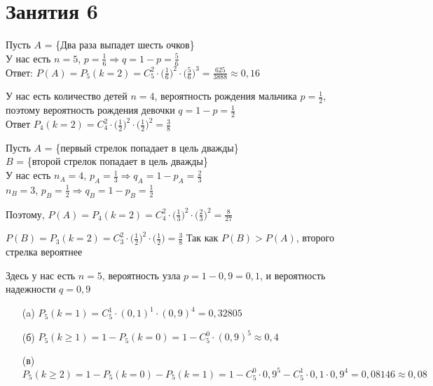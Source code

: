 \section*{Занятия 6}

\begin{exercise}[1]
	Пусть $A$ = \{Два раза выпадет шесть очков\} \\ У нас есть $n = 5$, $p = \frac{1}{6} \Rightarrow q = 1-p = \frac{5}{6}$ \\ Ответ: $P(A) = P_5(k=2) = C^2_5 \cdot \Big(\frac{1}{6}\Big)^2 \cdot \Big(\frac{5}{6}\Big)^3 = \frac{625}{3888} \approx 0,16$
\end{exercise}

\begin{exercise}[2]
	У нас есть количество детей $n=4$, вероятность рождения мальчика $p=\frac{1}{2}$, поэтому вероятность рождения девочки $q = 1-p = \frac{1}{2}$ \\ Ответ $P_4(k=2) = C^2_4 \cdot \Big(\frac{1}{2}\Big)^2 \cdot \Big(\frac{1}{2}\Big)^2 = \frac{3}{8}$
\end{exercise}

\begin{exercise}[3]
	Пусть $A$ = \{первый стрелок попадает в цель дважды\} \\ $B$ = \{второй стрелок попадает в цель дважды\} \\ У нас есть $n_A = 4$, $p_A = \frac{1}{3} \Rightarrow q_A = 1 - p_A = \frac{2}{3}$ \\ $n_B = 3$, $p_B = \frac{1}{2} \Rightarrow q_B = 1-p_B = \frac{1}{2}$
	
	Поэтому, $P(A) = P_4(k=2) = C^2_4 \cdot \Big(\frac{1}{3}\Big)^2 \cdot \Big(\frac{2}{3}\Big)^2 = \frac{8}{27}$ 
	
	$P(B) = P_3(k=2) = C^2_3 \cdot \Big(\frac{1}{2}\Big)^2 \cdot \Big(\frac{1}{2}\Big) = \frac{3}{8}$
	Так как $P(B) > P(A)$, второго стрелка вероятнее
\end{exercise}

\begin{exercise}[4]
	Здесь у нас есть $n=5$, вероятность узла $p = 1 - 0,9 = 0,1$, и вероятность надежности $q = 0,9$
	\begin{enumerate}
		\item [(a)] $P_5(k=1) = C^1_5 \cdot (0,1)^1 \cdot (0,9)^4 = 0,32805$
		\item [(б)] $P_5(k \geq 1) = 1 - P_5(k=0) = 1 - C^0_5 \cdot (0,9)^5 \approx 0,4$
		\item [(в)] $P_5(k \geq 2) = 1 - P_5(k=0) - P_5(k=1) = 1 - C^0_5 \cdot 0,9^5 - C^1_5 \cdot 0,1 \cdot 0,9^4 = 0,08146 \approx 0,08$
	\end{enumerate}
\end{exercise}

